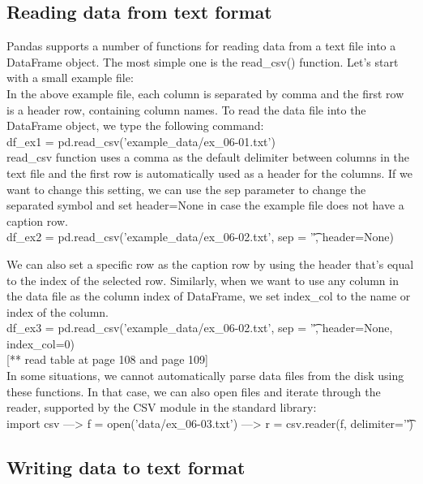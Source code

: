 \documentclass{article}
\numberwithin{equation}{section} %
\begin{document}
\subsection*{Reading data from text format}

Pandas supports a number of functions for reading data from a text file into a
DataFrame object. The most simple one is the read\_csv() function. Let's start with a
small example file: \\

In the above example file, each column is separated by comma and the first row is
a header row, containing column names. To read the data file into the DataFrame
object, we type the following command: \\

df\_ex1 = pd.read\_csv('example\_data/ex\_06-01.txt') \\

read\_csv function uses a comma as the default delimiter between columns in the text file and the first row is automatically used as a header for the columns. If we want to change this setting, we can use the sep parameter to change the separated symbol and set header=None in case the example file does not have a caption row. \\

df\_ex2 = pd.read\_csv('example\_data/ex\_06-02.txt', sep = '\t', header=None)

We can also set a specific row as the caption row by using the header that's equal to
the index of the selected row. Similarly, when we want to use any column in the
data file as the column index of DataFrame, we set index\_col to the name or index
of the column. \\

df\_ex3 = pd.read\_csv('example\_data/ex\_06-02.txt', sep = '\t', header=None, index\_col=0) \\

[** read table at page 108 and page 109] \\

In some situations, we cannot automatically parse data files from the disk using
these functions. In that case, we can also open files and iterate through the reader, supported by the CSV module in the standard library: \\

import csv ---> f = open('data/ex\_06-03.txt') ---> r = csv.reader(f, delimiter='\t') \\


\subsection*{Writing data to text format}
\end{document}
